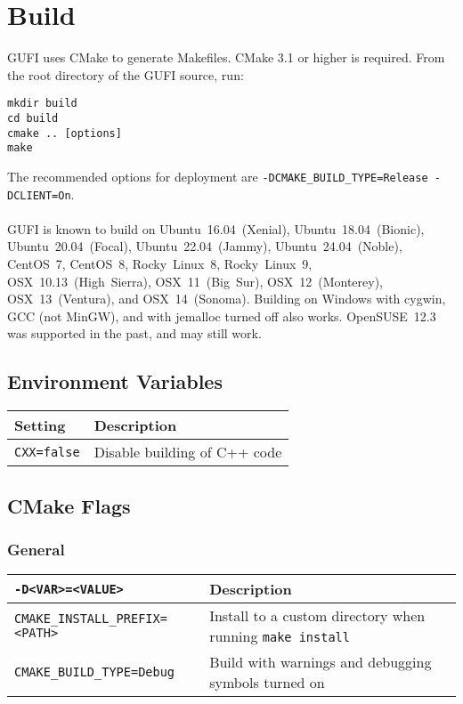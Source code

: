 \section{Build}

GUFI uses CMake to generate Makefiles. CMake 3.1 or higher is
required. From the root directory of the GUFI source, run:
\begin{verbatim}
mkdir build
cd build
cmake .. [options]
make
\end{verbatim}

The recommended options for deployment are
\texttt{-DCMAKE\_BUILD\_TYPE=Release -DCLIENT=On}.
\\\\
GUFI is known to build on Ubuntu~16.04~(Xenial),
Ubuntu~18.04~(Bionic), Ubuntu~20.04~(Focal), Ubuntu~22.04~(Jammy),
Ubuntu~24.04~(Noble), CentOS~7, CentOS~8, Rocky~Linux~8,
Rocky~Linux~9, OSX~10.13~(High~Sierra), OSX~11~(Big~Sur),
OSX~12~(Monterey), OSX~13~(Ventura), and OSX~14~(Sonoma). Building on
Windows with cygwin, GCC (not MinGW), and with jemalloc turned off
also works. OpenSUSE~12.3 was supported in the past, and may still
work.

\subsection{Environment Variables}
\begin{table}[h!]
\centering
\begin{tabularx}{1.2\textwidth}{| l | X |}
  \hline
  Setting & Description \\
  \hline
  \texttt{CXX=false} & Disable building of C++ code \\
  \hline
\end{tabularx}
\end{table}

\subsection{CMake Flags}

\subsubsection{General}
\begin{table}[h!]
\centering
\begin{tabularx}{1.2\textwidth}{| l | X |}
  \hline
  \texttt{-D<VAR>=<VALUE>} & Description \\
  \hline
  \texttt{CMAKE\_INSTALL\_PREFIX=<PATH>}
  & Install to a custom directory when running \texttt{make install} \\
  \hline
  \texttt{CMAKE\_BUILD\_TYPE=Debug}
  & Build with warnings and debugging symbols turned on \\
  \hline
\end{tabularx}
\end{table}

